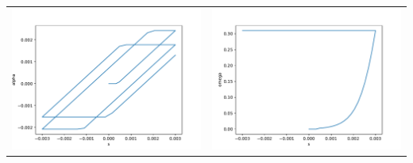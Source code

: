 \documentclass{article}
\newcounter{bmcsexample}
\begin{document}
\begin{bmcsexample}
\noindent
\begin{tabular}{L{7.5cm}L{7.5cm}}
\includegraphics[width=7.5cm]{fig140675827492624.pdf}
 & 
\includegraphics[width=7.5cm]{fig140675827493104.pdf}
 \\\end{tabular}

\end{bmcsexample}
\end{document}

